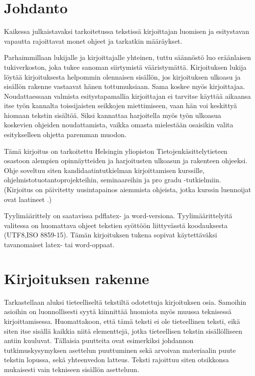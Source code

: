 \chapter{Johdanto}


Kaikessa julkaistavaksi tarkoitetussa tekstissä kirjoittajan luomisen ja
esitystavan vapautta rajoittavat monet ohjeet ja tarkatkin määräykset.

Parhaimmillaan lukijalle ja kirjoittajalle yhteinen, tuttu säännöstö luo
eräänlaisen tukiverkoston, joka tukee sanoman siirtymistä vääristymättä.
Kirjoituksen lukija löytää kirjoituksesta helpommin olennaisen sisällön,
jos kirjoituksen ulkoasu ja sisällön rakenne vastaavat hänen
tottumuksiaan. Sama koskee myös kirjoittajaa. Noudattaessaan valmista
esitystapamallia kirjoittajan ei tarvitse käyttää aikaansa itse työn
kannalta toissijaisten seikkojen miettimiseen, vaan hän voi keskittyä
hiomaan tekstin sisältöä. Siksi kannattaa harjoitella myös työn ulkoasua
koskevien ohjeiden noudattamista, vaikka omasta mielestään osaisikin
valita esitykselleen ohjetta paremman muodon.

Tämä kirjoitus on tarkoitettu Helsingin yliopiston
Tietojenkäsittelytieteen osastoon alempien opinnäytteiden ja
harjoitusten ulkoasun ja rakenteen ohjeeksi. Ohje soveltuu siten
kandidaatintutkielman kirjoittamisen kurssille, ohjelmistotuotantoprojekteihin, seminaareihin ja
pro gradu -tutkielmiin. (Kirjoitus on päivitetty uusintapainos aiemmista
ohjeista, jotka kurssin luennoijat ovat laatineet \citep{erkio01,erkiomakela96,erkio94,verkamo92}.)

Tyylimäärittely on saatavissa pdflatex- ja word-versiona.
Tyylimäärittelyitä valitessa on huomattava ohjeet tekstien syöttöön
liittyvässtä koodauksesta (UTF8,ISO 8859-15).
Tämän kirjoituksen tukena sopivat käytettäväksi tavanomaiset latex- tai
word-oppaat. 

\chapter{Kirjoituksen rakenne}

Tarkastellaan aluksi tieteelliseltä tekstiltä odotettuja
kirjoituksen osia. Samoihin asioihin on luonnollisesti syytä
kiinnittää huomiota myös muussa teknisessä kirjoittamisessa. Huomattakoon, että tämä teksti ei ole tieteellinen teksti, eikä siten itse sisällä kaikkia niitä elementtejä, jotka tieteellisen tekstin sisällölliseen antiin kuuluvat. Tällaisia puutteita ovat esimerkiksi johdannon tutkimuskysymyksen asettelun puuttuminen sekä arvoivan materiaalin puute tekstin lopussa, sekä yhteenvedon latteus.
Teksti rajoittuu siten otsikkonsa mukaisesti vain tekniseen sisällön asetteluun.

